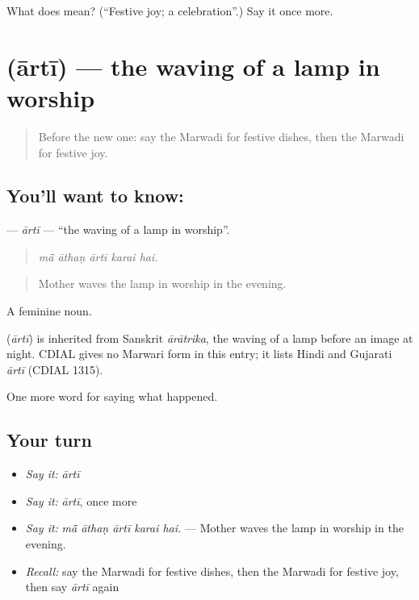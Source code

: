 \begin{tcolorbox}[breakable,colback=teal!4,colframe=teal!35!black,title={Before you move on}]
What does  mean? (\textquotedblleft{}Festive joy; a celebration\textquotedblright{}.) Say it once more.
\end{tcolorbox}
\section[\texorpdfstring{\mw{आरती} (ārtī)}{आरती (ārtī)}]{ (ārtī) — the waving of a lamp in worship}

\label{lesson:MW-C250-arti}



\begin{quote}
Before the new one: say the Marwadi for festive dishes, then the Marwadi for festive joy.
\end{quote}

\subsection*{You'll want to know: }
\textbf{} — \emph{ārtī} — \textquotedblleft{}the waving of a lamp in worship\textquotedblright{}.

\begin{quote}
    
\end{quote}

\begin{quote}
\emph{mā̃ āthaṇ ārtī karai hai.}
\end{quote}

\begin{quote}
Mother waves the lamp in worship in the evening.
\end{quote}

A feminine noun.

\begin{cousinweb}
\textbf{} (\emph{ārtī}) is inherited from Sanskrit \emph{ārātrika}, the waving of a lamp before an image at night. CDIAL gives no Marwari form in this entry; it lists Hindi and Gujarati \emph{ārtī} (CDIAL 1315).
\end{cousinweb}

\begin{grammarlens}[title={What you've built}]
One more word for saying what happened.
\end{grammarlens}

\subsection*{Your turn}
\begin{itemize}
\raggedright
  \item \emph{Say it:} \emph{ārtī}
  \item \emph{Say it:} \emph{ārtī}, once more
  \item \emph{Say it:} \emph{mā̃ āthaṇ ārtī karai hai.} — Mother waves the lamp in worship in the evening.
  \item \emph{Recall:} say the Marwadi for festive dishes, then the Marwadi for festive joy, then say \emph{ārtī} again
\end{itemize}


